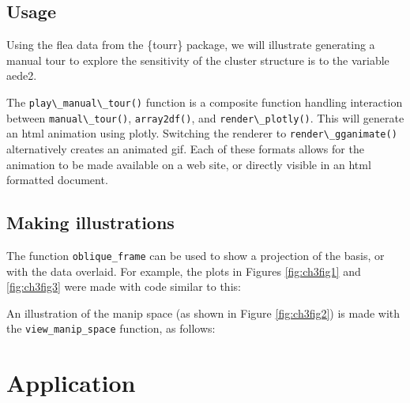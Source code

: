 \documentclass{template/monashthesis}
\begin{document}
\hypertarget{sec:usage}{%
\subsection{Usage}\label{sec:usage}}

Using the flea data from the \{tourr\} package, we will illustrate generating a manual tour to explore the sensitivity of the cluster structure is to the variable aede2.

\noindent The \texttt{play\textbackslash{}\_manual\textbackslash{}\_tour()} function is a composite function handling interaction between \texttt{manual\textbackslash{}\_tour()}, \texttt{array2df()}, and \texttt{render\textbackslash{}\_plotly()}. This will generate an html animation using plotly. Switching the renderer to \texttt{render\textbackslash{}\_gganimate()} alternatively creates an animated gif. Each of these formats allows for the animation to be made available on a web site, or directly visible in an html formatted document.

\hypertarget{making-illustrations}{%
\subsection{Making illustrations}\label{making-illustrations}}

The function \texttt{oblique\_frame} can be used to show a projection of the basis, or with the data overlaid. For example, the plots in Figures \ref{fig:ch3fig1} and \ref{fig:ch3fig3} were made with code similar to this:

\noindent An illustration of the manip space (as shown in Figure \ref{fig:ch3fig2}) is made with the \texttt{view\_manip\_space} function, as follows:

\begin{Shaded}
\begin{Highlighting}[]
\NormalTok{(}
                  
\end{Highlighting}
\end{Shaded}

\hypertarget{sec:application}{%
\section{Application}\label{sec:application}}
\end{document}
